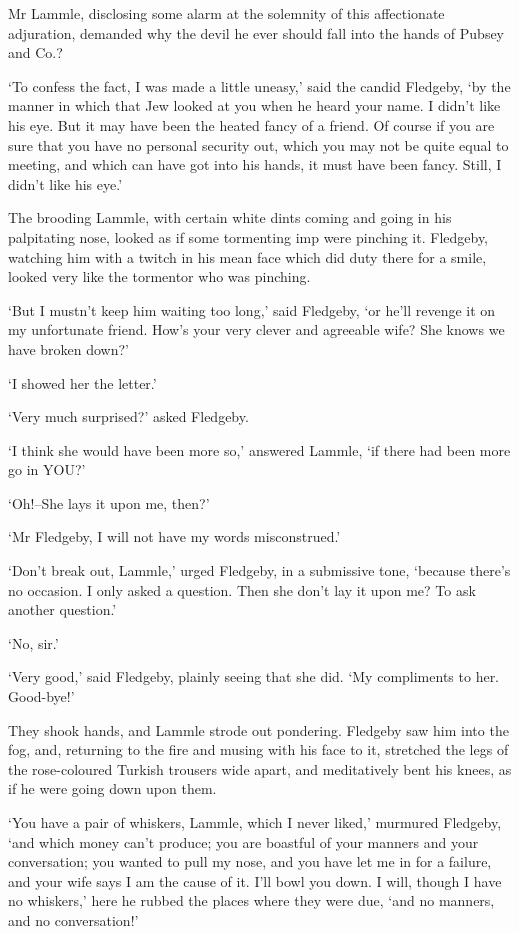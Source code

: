 Mr Lammle, disclosing some alarm at the solemnity of this affectionate
adjuration, demanded why the devil he ever should fall into the hands of
Pubsey and Co.?

‘To confess the fact, I was made a little uneasy,’ said the candid
Fledgeby, ‘by the manner in which that Jew looked at you when he heard
your name. I didn’t like his eye. But it may have been the heated
fancy of a friend. Of course if you are sure that you have no personal
security out, which you may not be quite equal to meeting, and which can
have got into his hands, it must have been fancy. Still, I didn’t like
his eye.’

The brooding Lammle, with certain white dints coming and going in his
palpitating nose, looked as if some tormenting imp were pinching it.
Fledgeby, watching him with a twitch in his mean face which did duty
there for a smile, looked very like the tormentor who was pinching.

‘But I mustn’t keep him waiting too long,’ said Fledgeby, ‘or he’ll
revenge it on my unfortunate friend. How’s your very clever and
agreeable wife? She knows we have broken down?’

‘I showed her the letter.’

‘Very much surprised?’ asked Fledgeby.

‘I think she would have been more so,’ answered Lammle, ‘if there had
been more go in YOU?’

‘Oh!--She lays it upon me, then?’

‘Mr Fledgeby, I will not have my words misconstrued.’

‘Don’t break out, Lammle,’ urged Fledgeby, in a submissive tone,
‘because there’s no occasion. I only asked a question. Then she don’t
lay it upon me? To ask another question.’

‘No, sir.’

‘Very good,’ said Fledgeby, plainly seeing that she did. ‘My compliments
to her. Good-bye!’

They shook hands, and Lammle strode out pondering. Fledgeby saw him
into the fog, and, returning to the fire and musing with his face to it,
stretched the legs of the rose-coloured Turkish trousers wide apart, and
meditatively bent his knees, as if he were going down upon them.

‘You have a pair of whiskers, Lammle, which I never liked,’ murmured
Fledgeby, ‘and which money can’t produce; you are boastful of your
manners and your conversation; you wanted to pull my nose, and you have
let me in for a failure, and your wife says I am the cause of it. I’ll
bowl you down. I will, though I have no whiskers,’ here he rubbed the
places where they were due, ‘and no manners, and no conversation!’

